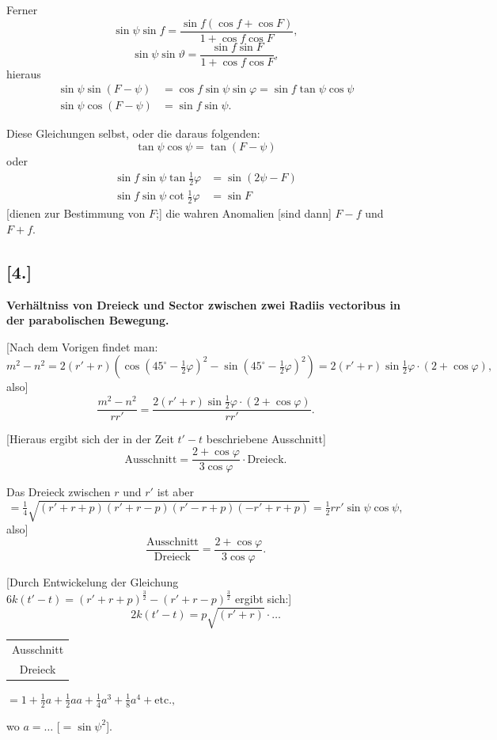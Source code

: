 \documentclass[12pt,a4paper]{article}
\begin{document}
Ferner
\[
\sin\psi\sin f = \frac{\sin f(\cos f + \cos F)}{1 + \cos f\cos F},
\]
\[
\sin\psi\sin\vartheta = \frac{\sin f\sin F}{1 + \cos f\cos F},
\]
hieraus
\begin{align*}
\sin\psi\sin(F - \psi) &= \cos f\sin\psi\sin\varphi = \sin f\tan\psi\cos\psi \\
\sin\psi\cos(F - \psi) &= \sin f\sin\psi.
\end{align*}

Diese Gleichungen selbst, oder die daraus folgenden:
\[
\tan\psi\cos\psi = \tan(F - \psi)
\]
oder
\begin{align*}
\sin f\sin\psi\tan\tfrac{1}{2}\varphi &= \sin(2\psi - F) \\
\sin f\sin\psi\cot\tfrac{1}{2}\varphi &= \sin F
\end{align*}
[dienen zur Bestimmung von $F$;] die wahren Anomalien [sind dann] $F - f$
und $F + f$.

\newpage

\subsection*{[4.]}
\textbf{Verh\"altniss von Dreieck und Sector zwischen zwei Radiis vectoribus
in der parabolischen Bewegung.}

[Nach dem Vorigen findet man:
\[
m^2 - n^2 = 2(r' + r)(\cos(45^\circ - \tfrac{1}{2}\varphi)^2 - \sin(45^\circ - \tfrac{1}{2}\varphi)^2) = 2(r' + r)\sin\tfrac{1}{2}\varphi \cdot (2 + \cos\varphi),
\]
also]
\[
\frac{m^2 - n^2}{rr'} = \frac{2(r' + r)\sin\tfrac{1}{2}\varphi \cdot (2 + \cos\varphi)}{rr'}.
\]

[Hieraus ergibt sich der in der Zeit $t' - t$ beschriebene Ausschnitt]
\[
\text{Ausschnitt} = \frac{2 + \cos\varphi}{3\cos\varphi} \cdot \text{Dreieck}.
\]

Das Dreieck zwischen $r$ und $r'$ ist aber
\[
= \tfrac{1}{4}\sqrt{(r' + r + p)(r' + r - p)(r' - r + p)(-r' + r + p)} = \tfrac{1}{2}rr'\sin\psi\cos\psi,
\]
also]
\[
\frac{\text{Ausschnitt}}{\text{Dreieck}} = \frac{2 + \cos\varphi}{3\cos\varphi}.
\]

[Durch Entwickelung der Gleichung $6k(t' - t) = (r' + r + p)^{\frac{3}{2}} - (r' + r - p)^{\frac{3}{2}}$
ergibt sich:]
\[
2k(t' - t) = p\sqrt{(r' + r)} \cdot \ldots
\]

\begin{center}
\begin{tabular}{c}
Ausschnitt \\
Dreieck
\end{tabular}
$= 1 + \tfrac{1}{2}a + \tfrac{1}{2}aa + \tfrac{1}{4}a^3 + \tfrac{1}{8}a^4 + \text{etc.},$

wo $a = \ldots$ [$= \sin\psi^2$].
\end{center}
\end{document}

